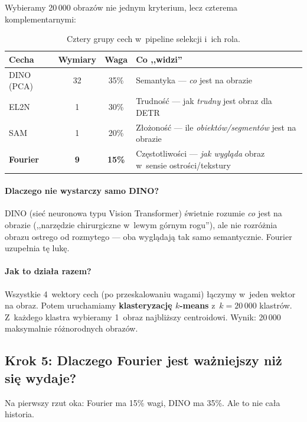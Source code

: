 Wybieramy 20\,000 obrazów nie jednym kryterium, lecz czterema
komplementarnymi:

\begin{table}[h]
\centering
\caption{Cztery grupy cech w~pipeline selekcji i~ich rola.}
\label{tab:pipeline_simple}
\begin{tabular}{lccl}
\toprule
\textbf{Cecha} & \textbf{Wymiary} & \textbf{Waga} & \textbf{Co ,,widzi''} \\
\midrule
DINO (PCA)  & 32  & 35\% & Semantyka --- \emph{co} jest na obrazie \\
EL2N        & 1   & 30\% & Trudność --- jak \emph{trudny} jest obraz dla DETR \\
SAM         & 1   & 20\% & Złożoność --- ile \emph{obiektów/segmentów} jest na obrazie \\
\textbf{Fourier} & \textbf{9} & \textbf{15\%} & Częstotliwości --- \emph{jak wygląda} obraz w~sensie ostrości/tekstury \\
\bottomrule
\end{tabular}
\end{table}

\paragraph{Dlaczego nie wystarczy samo DINO?}
DINO (sieć neuronowa typu Vision Transformer) świetnie rozumie \emph{co}
jest na obrazie (,,narzędzie chirurgiczne w~lewym górnym rogu''), ale nie
rozróżnia obrazu ostrego od rozmytego --- oba wyglądają tak samo semantycznie.
Fourier uzupełnia tę lukę.

\paragraph{Jak to działa razem?}
Wszystkie 4~wektory cech (po przeskalowaniu wagami) łączymy w~jeden wektor
na obraz.  Potem uruchamiamy \textbf{klasteryzację $k$-means} z~$k = 20\,000$
klastrów.  Z~każdego klastra wybieramy 1~obraz najbliższy centroidowi.
Wynik: 20\,000 maksymalnie różnorodnych obrazów.


\subsection{Krok 5: Dlaczego Fourier jest ważniejszy niż się wydaje?}
\label{sec:krok5}

Na pierwszy rzut oka: Fourier ma 15\% wagi, DINO ma 35\%.  Ale to nie
cała historia.

